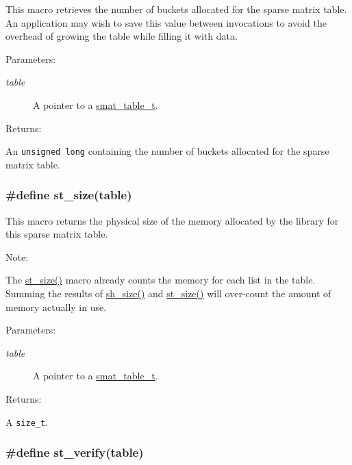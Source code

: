 This macro retrieves the number of buckets allocated for the sparse matrix table. An application may wish to save this value between invocations to avoid the overhead of growing the table while filling it with data.\begin{Desc}
\item[Parameters: ]\par
\begin{description}
\item[{\em 
table}]A pointer to a \hyperlink{group__dbprim__smat_a0}{smat\_\-table\_\-t}.\end{description}
\end{Desc}
\begin{Desc}
\item[Returns: ]\par
An {\tt unsigned long} containing the number of buckets allocated for the sparse matrix table. \end{Desc}
\hypertarget{group__dbprim__smat_a28}{
\subsubsection[st\_\-size]{\setlength{\rightskip}{0pt plus 5cm}\#define st\_\-size(table)}}
\label{group__dbprim__smat_a28}


This macro returns the physical size of the memory allocated by the library for this sparse matrix table.

\begin{Desc}
\item[Note: ]\par
The \hyperlink{group__dbprim__smat_a28}{st\_\-size()} macro already counts the memory for each list in the table. Summing the results of \hyperlink{group__dbprim__smat_a38}{sh\_\-size()} and \hyperlink{group__dbprim__smat_a28}{st\_\-size()} will over-count the amount of memory actually in use.\end{Desc}
\begin{Desc}
\item[Parameters: ]\par
\begin{description}
\item[{\em 
table}]A pointer to a \hyperlink{group__dbprim__smat_a0}{smat\_\-table\_\-t}.\end{description}
\end{Desc}
\begin{Desc}
\item[Returns: ]\par
A {\tt size\_\-t}. \end{Desc}
\hypertarget{group__dbprim__smat_a22}{
\subsubsection[st\_\-verify]{\setlength{\rightskip}{0pt plus 5cm}\#define st\_\-verify(table)}}
\label{group__dbprim__smat_a22}


